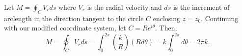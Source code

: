 \documentclass{article}
\begin{document}
Let $M=\oint_C V_r ds$ where $V_r$ is the radial velocity and $ds$ is the increment of arclength in the direction tangent to the circle $C$ enclosing $z=z_0$. Continuing with our modified coordinate system, let $C=Re^{i\theta}$. Then,
\[
M=\oint_C V_r ds=\int_0^{2\pi}(\frac{k}{R})(Rd\theta)=k\int_0^{2\pi}d\theta=2\pi k.
\]
\end{document}
